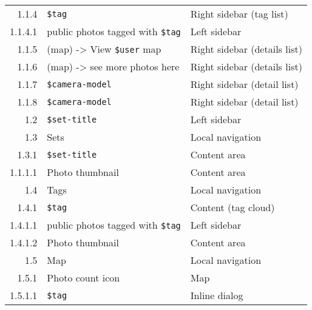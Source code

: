 \documentclass[11pt,a4paper]{article}
\newcommand{\var}[1]{\texttt{\${#1}}}
\begin{document}
\begin{center}
\begin{small}
\begin{longtable}{rll}
      1.1.4 &
      \var{tag} &
      Right sidebar (tag list) \\

        1.1.4.1 &
        public photos tagged with \var{tag} &
        Left sidebar \\

          1.1.5 &
          (map) -> View \var{user} map &
          Right sidebar (details list) \\

          1.1.6 &
          (map) -> see more photos here &
          Right sidebar (details list) \\

          1.1.7 &
          \var{camera-model} &
          Right sidebar (detail list) \\

          1.1.8 &
          \var{camera-model} &
          Right sidebar (detail list) \\

        1.2 &
        \var{set-title} &
        Left sidebar \\

        1.3 &
        Sets &
        Local navigation \\

          1.3.1 &
          \var{set-title} &
          Content area \\

            1.1.1.1 &
            Photo thumbnail &
            Content area \\


        1.4 &
        Tags &
        Local navigation \\

          1.4.1 &
          \var{tag} &
          Content (tag cloud) \\

            1.4.1.1 &
            public photos tagged with \var{tag} &
            Left sidebar \\

            1.4.1.2 &
            Photo thumbnail &
            Content area \\


        1.5 &
        Map &
        Local navigation \\

          1.5.1 &
          Photo count icon &
          Map \\

            1.5.1.1 &
            \var{tag} &
            Inline dialog \\


\end{longtable}
\end{small}
\end{center}
\end{document}
